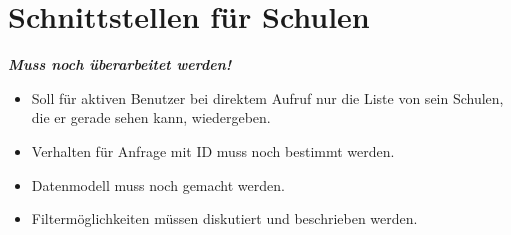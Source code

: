 \section{Schnittstellen für Schulen}
\textbf{\emph{\textcolor[rgb]{1,0,0}{Muss noch überarbeitet werden!}}}
\begin{itemize}
	\item Soll für aktiven Benutzer bei direktem Aufruf nur die Liste von sein Schulen, die er gerade sehen kann, wiedergeben.
	\item Verhalten für Anfrage mit ID muss noch bestimmt werden.
	\item Datenmodell muss noch gemacht werden.
	\item Filtermöglichkeiten müssen diskutiert und beschrieben werden.
\end{itemize}

%
%
%
%
%